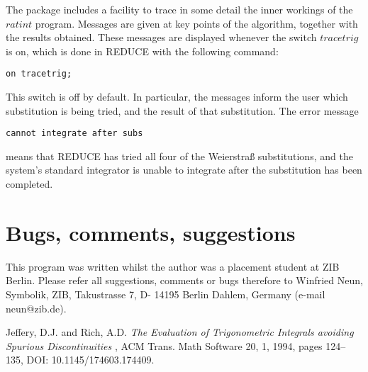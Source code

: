 The package includes a facility to trace in some detail the inner workings of the $ratint$ program. Messages are given at key points of the algorithm, together with the results obtained. These messages are displayed whenever the switch $tracetrig$ is on, which is done in \small{REDUCE} \normalsize with the following command:
\begin{verbatim}
on tracetrig;
\end{verbatim}
This switch is off by default. In particular, the messages inform the user which substitution is being tried, and the result of that substitution. The error message
\begin{verbatim}
cannot integrate after subs
\end{verbatim}
means that \small{REDUCE} \normalsize has tried all four of the Weierstra\ss \hspace{1 mm} substitutions, and the system's standard integrator is unable to integrate after the substitution has been completed.

\section{Bugs, comments, suggestions}
This program was written whilst the author was a placement student at ZIB Berlin. Please refer all suggestions, comments or bugs therefore to Winfried Neun, Symbolik, ZIB, Takustrasse 7, D- 14195 Berlin Dahlem, Germany (e-mail neun@zib.de).

\begin{thebibliography}{99999}

 Jeffery, D.J. and Rich, A.D.
{\it The Evaluation of Trigonometric Integrals avoiding Spurious Discontinuities
}, ACM Trans. Math Software 20, 1, 1994, pages 124--135, DOI: 10.1145/174603.174409.

\end{thebibliography}

